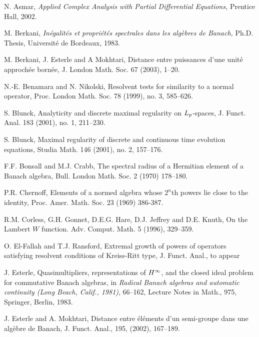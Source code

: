\documentclass[12pt]{amsart}
\begin{document}
\begin{thebibliography}{999}

N. Asmar, {\it Applied Complex Analysis with Partial Differential
Equations,} Prentice Hall, 2002.

M. Berkani,
{\it In\'egalit\'es et propri\'et\'es spectrales dans les alg\`ebres
de Banach,}  Ph.D. Thesis, Universit\'e de Bordeaux, 1983.

M. Berkani, J. Esterle and A Mokhtari, Distance entre puissances d'une
unit\'e approch\'ee born\'ee,
J. London Math. Soc. 67 (2003), 1--20.

N.-E. Benamara and N. Nikolski,
Resolvent tests for similarity to a normal operator,
Proc. London Math. Soc. 78 (1999), no. 3, 585--626.

S. Blunck,
Analyticity and discrete maximal regularity on $L\sb p$-spaces,
J. Funct. Anal.  183  (2001),  no. 1, 211--230.

S. Blunck,
Maximal regularity of discrete and continuous time evolution equations,
Studia Math.  146  (2001),  no. 2, 157--176.

F.F. Bonsall and M.J. Crabb,  The spectral radius of a Hermitian
element of a Banach algebra, Bull. London Math. Soc. 2 (1970)
178--180.

 P.R. Chernoff, Elements of a normed algebra
whose $2^n$th powers lie close to the identity, Proc. Amer. Math.
Soc. 23 (1969) 386-387.

R.M. Corless, G.H. Gonnet, D.E.G. Hare, D.J. Jeffrey and D.E.
Knuth,  On the Lambert $W$ function. Adv. Comput. Math. 5 (1996),
 329--359.

O. El-Fallah and T.J. Ransford,
Extremal growth of powers of operators satisfying resolvent
conditions of Kreiss-Ritt type, J. Funct. Anal., to appear

J. Esterle,  Quasimultipliers, representations of $H\sp{\infty }$,
and the closed ideal problem for commutative Banach algebras, in
{\it Radical Banach algebras and automatic continuity (Long Beach,
Calif., 1981)}, 66--162, Lecture Notes in Math., 975, Springer,
Berlin, 1983.

J. Esterle and A. Mokhtari, Distance entre \'el\'ements d'un semi-groupe dans
une alg\`ebre de Banach, J. Funct. Anal.,
195, (2002), 167--189.



\end{thebibliography}
\end{document}
